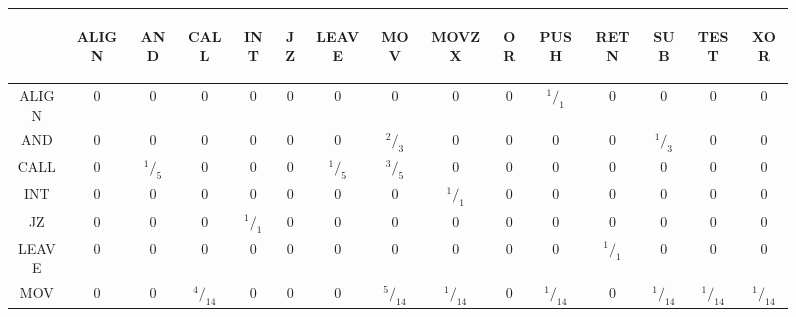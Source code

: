 \begin{figure}[h]
  \centering
\begin{tabular}{c|cccccccccccccc}
  & \begin{sideways}ALIGN\end{sideways}  & \begin{sideways}AND\end{sideways}  & \begin{sideways}CALL\end{sideways}  & \begin{sideways}INT\end{sideways}  & \begin{sideways}JZ\end{sideways}  & \begin{sideways}LEAVE\end{sideways}  & \begin{sideways}MOV\end{sideways}  & \begin{sideways}MOVZX\end{sideways}  & \begin{sideways}OR\end{sideways}  & \begin{sideways}PUSH\end{sideways}  & \begin{sideways}RETN\end{sideways}  & \begin{sideways}SUB\end{sideways}  & \begin{sideways}TEST\end{sideways}  & \begin{sideways}XOR\end{sideways} \\
 \midrule
ALIGN&  0&0&0& 0& 0& 0&  0&  0&  0&$^1/_1$& 0& 0& 0& 0 \\
AND& 0&0&0& 0& 0& 0&  $^2/_3$&  0&  0& 0& 0& $^1/_3$& 0& 0 \\
CALL&0&$^1/_5$ & 0& 0& 0&  $^1/_5$& $^3/_5$& 0& 0& 0& 0& 0& 0& 0 \\
INT& 0&0&0& 0& 0& 0& 0& $^1/_1$& 0&  0& 0& 0& 0& 0 \\
JZ&  0&0&0& $^1/_1$& 0& 0& 0&  0&  0&  0&  0&  0&  0&  0 \\
LEAVE&  0&0&0& 0& 0& 0& 0& 0& 0&  0&  $^1/_1$& 0&  0&  0 \\
MOV& 0&0&$^4/_{14}$& 0& 0&  0&  $^5/_{14}$& $^1/_{14}$& 0&  $^1/_{14}$& 0&  $^1/_{14}$&  $^1/_{14}$& $^1/_{14}$\\

\end{tabular}
\end{figure}
